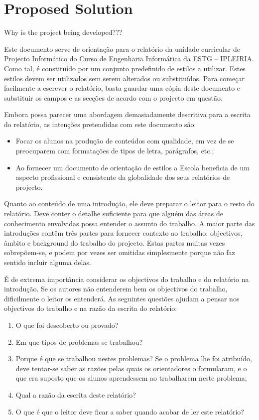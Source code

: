 
\section{Proposed Solution}

Why is the project being developed???

\pagebreak

Este documento serve de orientação para o relatório da unidade curricular de Projecto Informático do Curso de Engenharia Informática da ESTG – IPLEIRIA. Como tal, é constituído por um conjunto predefinido de estilos a utilizar. Estes estilos devem ser utilizados sem serem alterados ou substituídos. Para começar facilmente a escrever o relatório, basta guardar uma cópia deste documento e substituir os campos e as secções de acordo com o projecto em questão.

Embora possa parecer uma abordagem demasiadamente descritiva para a escrita do relatório, as intenções pretendidas com este documento são:

\begin{itemize}
 \item Focar os alunos na produção de conteúdos com qualidade, em vez de se preocuparem com formatações de tipos de letra, parágrafos, etc.;
 \item Ao fornecer um documento de orientação de estilos a Escola beneficia de um aspecto profissional e consistente da globalidade dos seus relatórios de projecto.
\end{itemize}


Quanto ao conteúdo de uma introdução, ele deve preparar o leitor para o resto do relatório. Deve conter o detalhe suficiente para que alguém das áreas de conhecimento envolvidas possa entender o assunto do trabalho. A maior parte das introduções contêm três partes para fornecer contexto ao trabalho: objectivos, âmbito e background do trabalho do projecto. Estas partes muitas vezes sobrepõem-se, e podem por vezes ser omitidas simplesmente porque não faz sentido incluir alguma delas.

É de extrema importância considerar os objectivos do trabalho e do relatório na introdução. Se os autores não entenderem bem os objectivos do trabalho, dificilmente o leitor os entenderá. As seguintes questões ajudam a pensar nos objectivos do trabalho e na razão da escrita do relatório:

\begin{enumerate}
 \item O que foi descoberto ou provado?
 \item Em que tipos de problemas se trabalhou?
 \item Porque é que se trabalhou nestes problemas? Se o problema lhe foi atribuído, deve tentar-se saber as razões pelas quais os orientadores o formularam, e o que era suposto que os alunos aprendessem ao trabalharem neste problema;
 \item Qual a razão da escrita deste relatório?
 \item O que é que o leitor deve ficar a saber quando acabar de ler este relatório?
\end{enumerate}


